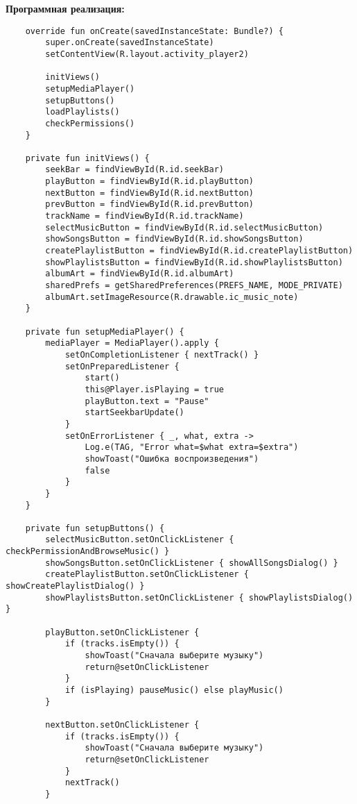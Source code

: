 \textbf{Программная реализация:}
\begin{verbatim}
	override fun onCreate(savedInstanceState: Bundle?) {
        super.onCreate(savedInstanceState)
        setContentView(R.layout.activity_player2)

        initViews()
        setupMediaPlayer()
        setupButtons()
        loadPlaylists()
        checkPermissions()
    }

    private fun initViews() {
        seekBar = findViewById(R.id.seekBar)
        playButton = findViewById(R.id.playButton)
        nextButton = findViewById(R.id.nextButton)
        prevButton = findViewById(R.id.prevButton)
        trackName = findViewById(R.id.trackName)
        selectMusicButton = findViewById(R.id.selectMusicButton)
        showSongsButton = findViewById(R.id.showSongsButton)
        createPlaylistButton = findViewById(R.id.createPlaylistButton)
        showPlaylistsButton = findViewById(R.id.showPlaylistsButton)
        albumArt = findViewById(R.id.albumArt)
        sharedPrefs = getSharedPreferences(PREFS_NAME, MODE_PRIVATE)
        albumArt.setImageResource(R.drawable.ic_music_note)
    }

    private fun setupMediaPlayer() {
        mediaPlayer = MediaPlayer().apply {
            setOnCompletionListener { nextTrack() }
            setOnPreparedListener {
                start()
                this@Player.isPlaying = true
                playButton.text = "Pause"
                startSeekbarUpdate()
            }
            setOnErrorListener { _, what, extra ->
                Log.e(TAG, "Error what=$what extra=$extra")
                showToast("Ошибка воспроизведения")
                false
            }
        }
    }

    private fun setupButtons() {
        selectMusicButton.setOnClickListener { checkPermissionAndBrowseMusic() }
        showSongsButton.setOnClickListener { showAllSongsDialog() }
        createPlaylistButton.setOnClickListener { showCreatePlaylistDialog() }
        showPlaylistsButton.setOnClickListener { showPlaylistsDialog() }

        playButton.setOnClickListener {
            if (tracks.isEmpty()) {
                showToast("Сначала выберите музыку")
                return@setOnClickListener
            }
            if (isPlaying) pauseMusic() else playMusic()
        }

        nextButton.setOnClickListener {
            if (tracks.isEmpty()) {
                showToast("Сначала выберите музыку")
                return@setOnClickListener
            }
            nextTrack()
        }


\end{verbatim}
